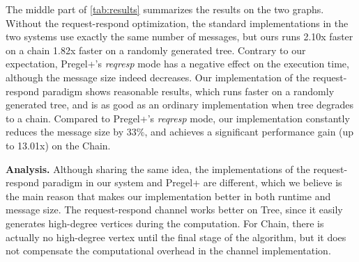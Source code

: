 \documentclass{sokendai_thesis} %
\newcommand{\PP}{Pregel+}
\begin{document}
The middle part of \autoref{tab:results} summarizes the results on the two graphs.
Without the request-respond optimization, the standard implementations in the two systems use exactly the same number of messages, but ours runs 2.10x faster on a chain 1.82x faster on a randomly generated tree.
Contrary to our expectation, \PP{}'s \textit{reqresp} mode has a negative effect on the execution time, although the message size indeed decreases.
Our implementation of the request-respond paradigm shows reasonable results, which runs faster on a randomly generated tree, and is as good as an ordinary implementation when tree degrades to a chain.
Compared to \PP{}'s \textit{reqresp} mode, our implementation constantly reduces the message size by $33\%$, and achieves a significant performance gain (up to 13.01x) on the Chain.

\textbf{Analysis.}
Although sharing the same idea, the implementations of the request-respond paradigm in our system and \PP{} are different, which we believe is the main reason that makes our implementation better in both runtime and message size.
The request-respond channel works better on Tree, since it easily generates high-degree vertices during the computation.
For Chain, there is actually no high-degree vertex until the final stage of the algorithm, but it does not compensate the computational overhead in the channel implementation.
\end{document}
